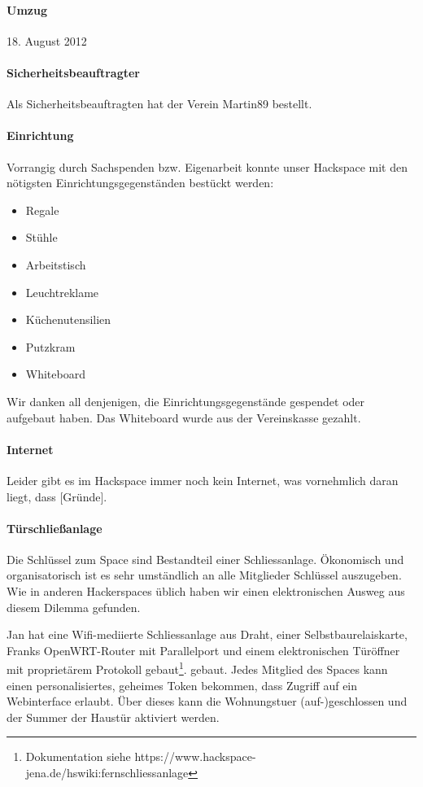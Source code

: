 \documentclass[10pt,DIV16]{scrartcl}
\begin{document}
\paragraph{Umzug}

18. August 2012

\paragraph{Sicherheitsbeauftragter}

Als Sicherheitsbeauftragten hat der Verein Martin89 bestellt.

\paragraph{Einrichtung}

Vorrangig durch Sachspenden bzw. Eigenarbeit konnte unser Hackspace mit den
nötigsten Einrichtungsgegenständen bestückt werden:
\begin{itemize}
	\item Regale
	\item Stühle
	\item Arbeitstisch
	\item Leuchtreklame
	\item Küchenutensilien
	\item Putzkram
	\item Whiteboard
\end{itemize}
Wir danken all denjenigen, die Einrichtungsgegenstände gespendet oder
aufgebaut haben.  Das Whiteboard wurde aus der Vereinskasse gezahlt.

\paragraph{Internet}

Leider gibt es im Hackspace immer noch kein Internet, was vornehmlich daran
liegt, dass [Gründe].

\paragraph{Türschließanlage}

Die Schl\"ussel zum Space sind Bestandteil einer
Schliessanlage. \"Okonomisch und organisatorisch ist es sehr
umst\"andlich an alle Mitglieder Schl\"ussel auszugeben. Wie in
anderen Hackerspaces \"ublich haben wir einen elektronischen Ausweg
aus diesem Dilemma gefunden.

Jan hat eine Wifi-mediierte Schliessanlage aus Draht, einer
Selbstbaurelaiskarte, Franks OpenWRT-Router mit Parallelport und einem
elektronischen T\"ur\"offner mit propriet\"arem Protokoll
gebaut\footnote{Dokumentation siehe
  https://www.hackspace-jena.de/hswiki:fernschliessanlage}.
gebaut. Jedes Mitglied des Spaces kann einen personalisiertes,
geheimes Token bekommen, dass Zugriff auf ein Webinterface
erlaubt. \"Uber dieses kann die Wohnungstuer (auf-)geschlossen und der
Summer der Haust\"ur aktiviert werden.
\end{document}
